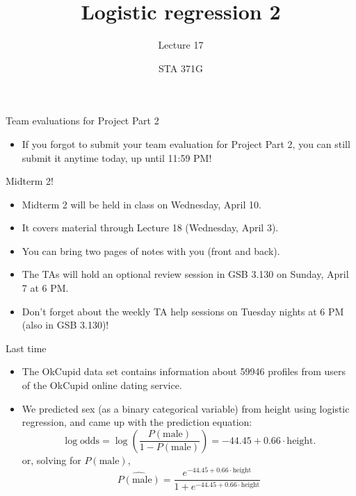 \documentclass{beamer}\usepackage[]{graphicx}\usepackage[]{color}
\title{Logistic regression 2}
\subtitle{Lecture 17}
\author{STA 371G}
\begin{document}
  
  

  \frame{\maketitle}



  \begin{darkframes}
    \begin{frame}{Team evaluations for Project Part 2}
      \begin{itemize}
        \item If you forgot to submit your team evaluation for Project Part 2, you can still submit it anytime today, up until 11:59 PM!
      \end{itemize}
    \end{frame}

    \begin{frame}{Midterm 2!}
      \begin{itemize}[<+->]
        \item Midterm 2 will be held in class on Wednesday, April 10.
        \item It covers material through Lecture 18 (Wednesday, April 3).
        \item You can bring \alert{two} pages of notes with you (front and back).
        \item The TAs will hold an optional review session in \alert{GSB 3.130} on Sunday, April 7 at 6 PM.
        \item Don't forget about the weekly TA help sessions on Tuesday nights at 6 PM (also in GSB 3.130)!
      \end{itemize}
    \end{frame}

    \begin{frame}{Last time}

      \begin{itemize}
        \item The OkCupid data set contains information about 59946 profiles from users of the OkCupid online dating service.
        \item We predicted sex (as a binary categorical variable) from height using logistic regression, and came up with the prediction equation:
        \[
          \log\text{odds} = \log\left(\frac{P(\text{male})}{1-P(\text{male})}\right) = -44.45 + 0.66\cdot\text{height}.
        \]
        or, solving for $P(\text{male})$,
        \[
          \widehat{P(\text{male})} = \frac{e^{-44.45 + 0.66\cdot\text{height}}}{1 + e^{-44.45 + 0.66\cdot\text{height}}}
        \]
      \end{itemize}
    \end{frame}


\end{darkframes}
\end{document}
